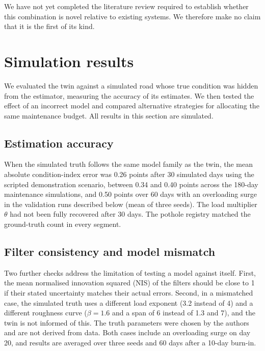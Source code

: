 \documentclass[11pt,a4paper]{article}
\renewcommand{\arraystretch}{1.35}
\begin{document}
We have not yet completed the literature review required to establish whether this combination is novel relative to existing systems. We therefore make no claim that it is the first of its kind.

\section{Simulation results}\label{sec:results}
We evaluated the twin against a simulated road whose true condition was hidden from the estimator, measuring the accuracy of its estimates. We then tested the effect of an incorrect model and compared alternative strategies for allocating the same maintenance budget. All results in this section are simulated.

\subsection{Estimation accuracy}
When the simulated truth follows the same model family as the twin, the mean absolute condition-index error was 0.26 points after 30 simulated days using the scripted demonstration scenario, between 0.34 and 0.40 points across the 180-day maintenance simulations, and 0.50 points over 60 days with an overloading surge in the validation runs described below (mean of three seeds). The load multiplier $\theta$ had not been fully recovered after 30 days. The pothole registry matched the ground-truth count in every segment.

\subsection{Filter consistency and model mismatch}
Two further checks address the limitation of testing a model against itself. First, the mean normalised innovation squared (NIS) of the filters should be close to 1 if their stated uncertainty matches their actual errors. Second, in a mismatched case, the simulated truth uses a different load exponent (3.2 instead of 4) and a different roughness curve ($\beta=1.6$ and a span of 6 instead of 1.3 and 7), and the twin is not informed of this. The truth parameters were chosen by the authors and are not derived from data. Both cases include an overloading surge on day 20, and results are averaged over three seeds and 60 days after a 10-day burn-in.

\begin{table}[h]
\centering\small
\renewcommand{\arraystretch}{1.4}

\caption{Estimator validation (simulated). CI error is expressed in condition-index points, bias is the estimate minus the truth, and ``within 2 SD'' is the share of segment-days on which the true CI lay within two of the twin's reported standard deviations.}
\end{table}
\end{document}
